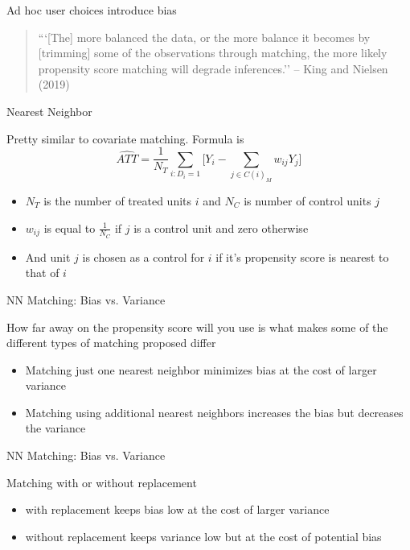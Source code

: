 \documentclass{beamer}
\begin{document}
\begin{frame}{Ad hoc user choices introduce bias}

\begin{quote}
	
```[The] more balanced the data, or the more balance it becomes by [trimming] some of the observations through matching, the more likely propensity score matching will degrade inferences.'' -- King and Nielsen (2019)

\end{quote}
	
\end{frame}



\begin{frame}{Nearest Neighbor}
	
	Pretty similar to covariate matching.  Formula is $$\widehat{ATT} = \frac{1}{N_T} \sum_{i:D_i=1} \bigg [ Y_i - \sum_{j \in C(i)_M} w_{ij}Y_j \bigg ]$$ 
		\begin{itemize}
		\item $N_T$ is the number of treated units $i$ and  $N_C$ is number of control units $j$
		\item $w_{ij}$ is equal to $\frac{1}{N_C}$ if $j$ is a control unit and zero otherwise
		\item And unit $j$ is chosen as a control for $i$ if it's propensity score is nearest to that of $i$
		\end{itemize}
\end{frame}

\begin{frame}{NN Matching: Bias vs. Variance}
	
How far away on the propensity score will you use is what makes some of the different types of matching proposed differ
		\begin{itemize}
		\item Matching just one nearest neighbor minimizes bias at the cost of larger variance
		\item Matching using additional nearest neighbors increases the bias but decreases the variance
		\end{itemize}
	
\end{frame}

\begin{frame}{NN Matching: Bias vs. Variance}
	
	 Matching with or without replacement
		\begin{itemize}
		\item with replacement keeps bias low at the cost of larger variance
		\item without replacement keeps variance low but at the cost of potential bias
		\end{itemize}
	
\end{frame}
\end{document}
